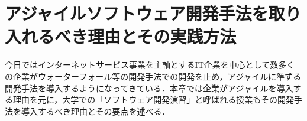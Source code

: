 \chapter{アジャイルソフトウェア開発手法を取り入れるべき理由とその実践方法}

今日ではインターネットサービス事業を主軸とするIT企業を中心として数多くの企業がウォーターフォール等の開発手法での開発を止め，アジャイルに準ずる開発手法を導入するようになってきている．本章では企業がアジャイルを導入する理由を元に，大学での「ソフトウェア開発演習」と呼ばれる授業もその開発手法を導入するべき理由とその要点を述べる．



